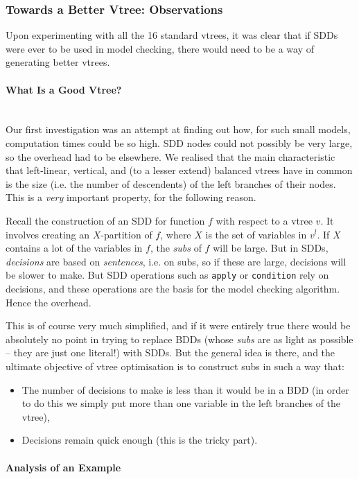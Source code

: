 \documentclass[11pt]{article}
\newcommand{\myparagraph}[1]{\paragraph{#1}\mbox{}\\}
\begin{document}
\subsubsection{Towards a Better Vtree: Observations}

Upon experimenting with all the 16 standard vtrees, it was clear that if SDDs were ever to be used in model checking, there would need to be a way of generating better vtrees. 

\myparagraph{What Is a Good Vtree?}

Our first investigation was an attempt at finding out how, for such small models, computation times could be so high. SDD nodes could not possibly be very large, so the overhead had to be elsewhere. We realised that the main characteristic that left-linear, vertical, and (to a lesser extend) balanced vtrees have in common is the size (i.e. the number of descendents) of the left branches of their nodes. 
This is a \textit{very }important property, for the following reason. 

Recall the construction of an SDD for function $f$ with respect to a vtree $v$. It involves creating an $X$-partition of $f$, where $X$ is the set of variables in $v^l$. If $X$ contains a lot of the variables in $f$, the \textit{subs} of $f$ will be large. But in SDDs, \textit{decisions} are based on \textit{sentences}, i.e. on subs, so if these are large, decisions will be slower to make. But SDD operations such as \texttt{apply} or \texttt{condition} rely on decisions, and these operations are the basis for the model checking algorithm. Hence the overhead.

This is of course very much simplified, and if it were entirely true there would be absolutely no point in trying to replace BDDs (whose \textit{subs} are as light as possible -- they are just one literal!) with SDDs. But the general idea is there, and the ultimate objective of vtree optimisation is to construct subs in such a way that: \begin{itemize}
\item The number of decisions to make is less than it would be in a BDD (in order to do this we simply put more than one variable in the left branches of the vtree),
\item Decisions remain quick enough (this is the tricky part).
\end{itemize}

\myparagraph{Analysis of an Example}
\end{document}
